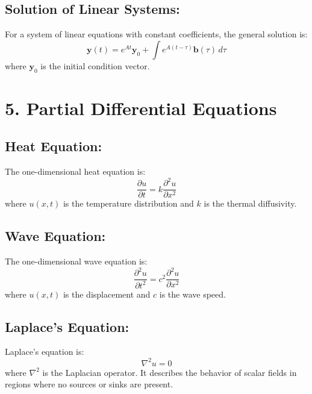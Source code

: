 \documentclass[../Main.tex]{subfiles}
\begin{document}
\subsection*{Solution of Linear Systems:}
For a system of linear equations with constant coefficients, the general solution is:
\[
\mathbf{y}(t) = e^{At} \mathbf{y}_0 + \int e^{A(t-\tau)} \mathbf{b}(\tau) \, d\tau
\]
where \( \mathbf{y}_0 \) is the initial condition vector.

\section*{5. Partial Differential Equations}

\subsection*{Heat Equation:}
The one-dimensional heat equation is:
\[
\frac{\partial u}{\partial t} = k \frac{\partial^2 u}{\partial x^2}
\]
where \( u(x,t) \) is the temperature distribution and \( k \) is the thermal diffusivity.

\subsection*{Wave Equation:}
The one-dimensional wave equation is:
\[
\frac{\partial^2 u}{\partial t^2} = c^2 \frac{\partial^2 u}{\partial x^2}
\]
where \( u(x,t) \) is the displacement and \( c \) is the wave speed.

\subsection*{Laplace's Equation:}
Laplace's equation is:
\[
\nabla^2 u = 0
\]
where \( \nabla^2 \) is the Laplacian operator. It describes the behavior of scalar fields in regions where no sources or sinks are present.
\end{document}
